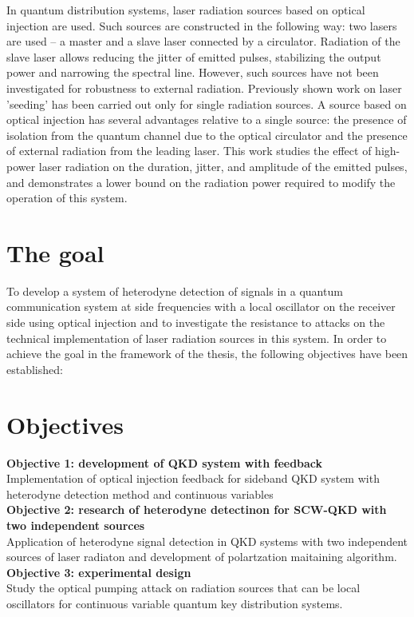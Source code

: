 In quantum distribution systems, laser radiation sources based on optical injection are used. Such sources are constructed in the following way: two lasers are used -- a master and a slave laser connected by a circulator. Radiation of the slave laser allows reducing the jitter of emitted pulses, stabilizing the output power and narrowing the spectral line. However, such sources have not been investigated for robustness to external radiation. Previously shown work on laser 'seeding' has been carried out only for single radiation sources. A source based on optical injection has several advantages relative to a single source: the presence of isolation from the quantum channel due to the optical circulator and the presence of external radiation from the leading laser. This work studies the effect of high-power laser radiation on the duration, jitter, and amplitude of the emitted pulses, and demonstrates a lower bound on the radiation power required to modify the operation of this system.

\section*{The goal}

To develop a system of heterodyne detection of signals in a quantum communication system at side frequencies with a local oscillator on the receiver side using optical injection and to investigate the resistance to attacks on the technical implementation of laser radiation sources in this system.
In order to achieve the goal in the framework of the thesis, the following objectives have been established:
\section*{Objectives}
\textbf{Objective 1: development of QKD system with feedback}\\
Implementation of optical injection feedback for sideband QKD system with heterodyne detection method and continuous variables\\

\textbf{Objective 2: research of heterodyne detectinon for SCW-QKD with two independent sources} \\
Application of heterodyne signal detection in QKD systems with two independent sources of laser radiaton and development of polartzation maitaining algorithm.\\

\textbf{Objective 3: experimental design}\\
Study the optical pumping attack on radiation sources that can be local oscillators for continuous variable quantum key distribution systems.\\

